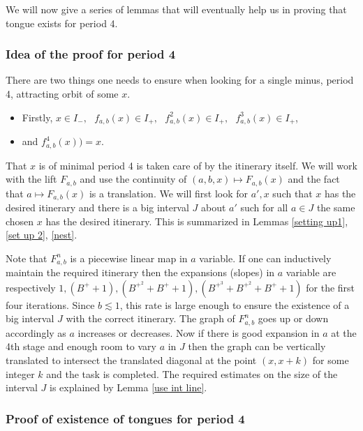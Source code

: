 \documentclass[12pt]{amsart}
\numberwithin{equation}{section}
\theoremstyle{remark}
\begin{document}
 


We will now give a series of lemmas that will eventually help us in proving that tongue exists for period 4. 
\subsubsection{\textbf{Idea of the proof for period 4}}
\vspace{.2cm}

There are two things one needs to ensure when looking for a single minus, period 4, attracting orbit of some $x$.
\begin{itemize}
    \item 
    Firstly,  $x \in I_-, \text{ }f_{a,b}(x)\in I_+, \text{ } f_{a,b}^2(x)\in I_+, \text{ } f_{a,b}^3(x)\in I_+ $,
    
    \item and $f_{a,b}^4(x))=x$.
\end{itemize}

\indent That $x$ is of minimal period 4 is taken care of by the itinerary itself. We will work with the lift $F_{a,b}$ and use the continuity of $(a,b,x) \mapsto F_{a,b}(x)$ and the fact that $a \mapsto F_{a,b}(x)$ is a translation. We will first look for  $a',x$ such that  $x$ has the desired itinerary and there is a big interval $J$ about $a'$ such for all $a\in J$ the same chosen $x$ has the desired itinerary. This is summarized in Lemmas \ref{setting up1}, \ref{set up 2}, \ref{nest}.

\vspace{.2cm}

\indent Note that $F_{a,b}^n$ is a piecewise  linear map in $a$ variable. If one can inductively maintain the required itinerary then the expansions (slopes) in $a$ variable are respectively $1,   (B^++1), (B^{+^{2}}+B^++1), (B^{+^{3}}+B^{+^{2}}+B^++1)$ for the first four iterations. Since $b\lesssim1$, this rate is large enough to ensure the existence of a big interval $J$ with the correct itinerary. The graph of $F^n_{a,b}$ goes up or down accordingly as $a$ increases or decreases. Now if there is good  expansion in $a$ at the 4th stage  and enough room to vary $a$ in $J$ then the graph can be vertically translated to intersect the translated diagonal at the point $(x,x+k)$ for some integer $k$ and the task is completed. The required estimates on the size of the interval $J$ is explained by Lemma \ref{use int line}.   \\
 

\subsubsection{\textbf{Proof of existence of tongues for period 4}}
\vspace{.3cm}
 
\end{document}
